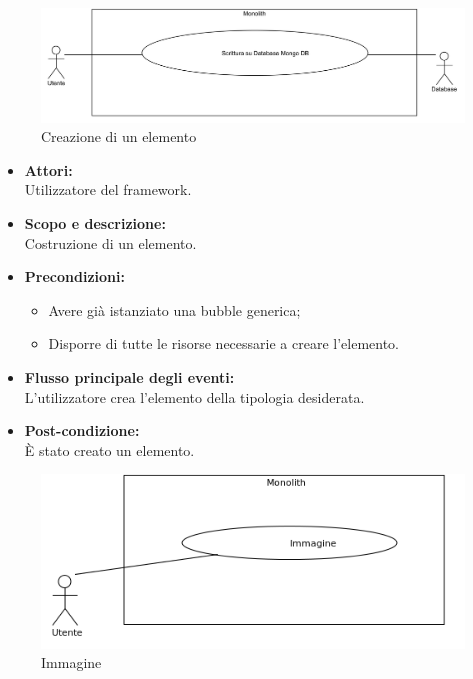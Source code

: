 
\begin{figure}[H]
	\centering
	\includegraphics[width=15cm]{../../documenti/AnalisiDeiRequisiti/Diagrammi_img/uc1_02.png}
	\caption{\UCFCaption{} Creazione di un elemento}
\end{figure}

\begin{itemize}
	\item \textbf{Attori:}
	\\Utilizzatore del framework.
	\item \textbf{Scopo e descrizione:} 
	\\Costruzione di un elemento.
	\item \textbf{Precondizioni:}
	\begin{itemize}
		\item Avere già istanziato una bubble generica;
		\item Disporre di tutte le risorse necessarie a creare l'elemento.
	\end{itemize}
	\item \textbf{Flusso principale degli eventi:}
	\\L'utilizzatore crea l'elemento della tipologia desiderata.
	\item \textbf{Post-condizione:}
	\\È stato creato un elemento.
\end{itemize}


\begin{figure}[H]
	\centering
	\includegraphics[width=15cm]{../../documenti/AnalisiDeiRequisiti/Diagrammi_img/uc1_25.png}
	\caption{\UCFFCaption{} Immagine}
\end{figure}

